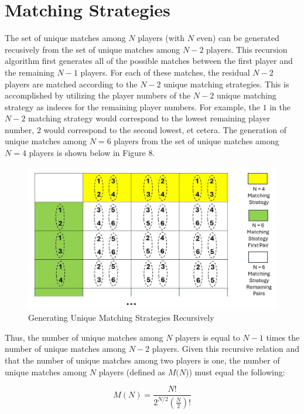 \documentclass[sn-mathphys-num]{sn-jnl}
\theoremstyle{thmstyleone}%
\theoremstyle{thmstyletwo}%
\theoremstyle{thmstylethree}%
\begin{document}
\pagebreak 

\appendix
\section{Matching Strategies}

The set of unique matches among $N$ players (with $N$ even) can be generated recusively from the set of unique matches among $N-2$ players. This recursion algorithm first generates all of the possible matches between the first player and the remaining $N-1$ players. For each of these matches, the residual $N-2$ players are matched according to the $N-2$ unique matching strategies. This is accomplished by utilizing the player numbers of the $N-2$ unique matching strategy as indeces for the remaining player numbers. For example, the $1$ in the $N-2$ matching strategy would correspond to the lowest remaining player number, $2$ would correspond to the second lowest, et cetera. The generation of unique matches among $N = 6$ players from the set of unique matches among $N = 4$ players is shown below in Figure 8.

\begin{figure}[H]
	\centering
	\includegraphics[width=12cm]{Iterative Matching Generation}
	\caption{Generating Unique Matching Strategies Recursively}
\end{figure}

Thus, the number of unique matches among $N$ players is equal to $N-1$ times the number of unique matches among $N-2$ players. 
Given this recursive relation and that the number of unique matches among two players is one, the number of unique matches among $N$ players (defined as $M(N$)) must equal the following:

\begin{equation}
M(N) = \frac{N!}{2^{N/2}(\frac{N}{2})!}
\end{equation}
\vspace{.05in}
\end{document}
